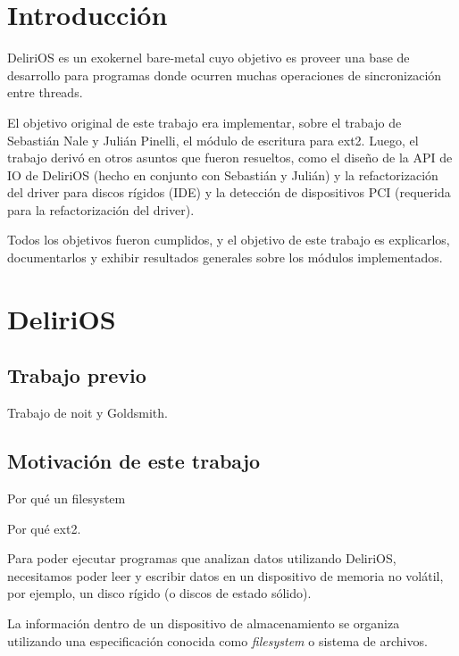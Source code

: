 \section{Introducción}
DeliriOS es un exokernel bare-metal cuyo objetivo es proveer una base de desarrollo para programas donde ocurren muchas operaciones de sincronización entre threads.

El objetivo original de este trabajo era implementar, sobre el trabajo de Sebastián Nale y Julián Pinelli, el módulo de escritura para ext2.
Luego, el trabajo derivó en otros asuntos que fueron resueltos, como el diseño de la API de IO de DeliriOS (hecho en conjunto con Sebastián y Julián) y la refactorización del driver para discos rígidos (IDE) y la detección de dispositivos PCI (requerida para la refactorización del driver).

Todos los objetivos fueron cumplidos, y el objetivo de este trabajo es explicarlos, documentarlos y exhibir resultados generales sobre los módulos implementados.
\newpage

\section{DeliriOS}

\subsection{Trabajo previo}
\begin{puntos}
  \item Trabajo de noit y Goldsmith.
\end{puntos}



\subsection{Motivación de este trabajo}

\begin{puntos}
  \item Por qué un filesystem
  \item Por qué ext2.
\end{puntos}

Para poder ejecutar programas que analizan datos utilizando DeliriOS, necesitamos poder leer y escribir datos en un dispositivo de memoria no volátil, por ejemplo, un disco rígido (o discos de estado sólido).

La información dentro de un dispositivo de almacenamiento se organiza utilizando una especificación conocida como \emph{filesystem} o sistema de archivos. 

